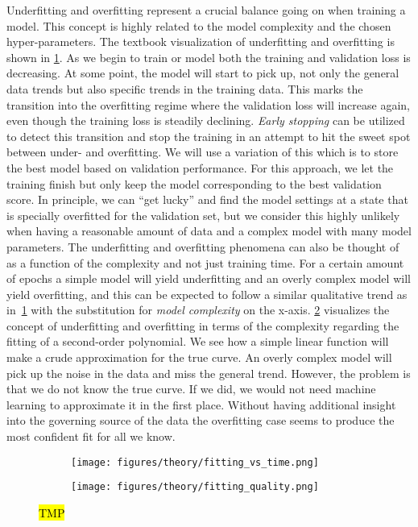 Underfitting and overfitting represent a crucial balance going on when training
a model. This concept is highly related to the model complexity and the chosen
hyper-parameters. The textbook visualization of underfitting and overfitting is
shown in \cref{fig:fitting_vs_time}. As we begin to train or model both the
training and validation loss is decreasing. At some point, the model will start
to pick up, not only the general data trends but also specific trends in the
training data. This marks the transition into the overfitting regime where the
validation loss will increase again, even though the training loss is steadily
declining.  \textit{Early stopping} can be utilized to detect this transition
and stop the training in an attempt to hit the sweet spot between under- and
overfitting. We will use a variation of this which is to store the best model
based on validation performance. For this approach, we let the training finish
but only keep the model corresponding to the best validation score. In
principle, we can ``get lucky'' and find the model settings at a state that is
specially overfitted for the validation set, but we consider this highly
unlikely when having a reasonable amount of data and a complex model with many
model parameters. The underfitting and overfitting phenomena can also be thought
of as a function of the complexity and not just training time. For a certain
amount of epochs a simple model will yield underfitting and an overly complex
model will yield overfitting, and this can be expected to follow a similar
qualitative trend as in~\cref{fig:fitting_vs_time} with the substitution for
\textit{model complexity} on the x-axis. \cref{fig:fitting_quality} visualizes
the concept of underfitting and overfitting in terms of the complexity regarding
the fitting of a second-order polynomial. We see how a simple linear function
will make a crude approximation for the true curve. An overly complex model will
pick up the noise in the data and miss the general trend. However, the problem
is that we do not know the true curve. If we did, we would not need machine
learning to approximate it in the first place. Without having additional insight
into the governing source of the data the overfitting case seems to produce the
most confident fit for all we know. 




\begin{figure}[H]
  \centering
  \begin{subfigure}[t]{0.42\textwidth}
    \centering
    \texttt{[image: figures/theory/fitting\_vs\_time.png]}
    \caption{}
    \label{fig:fitting_vs_time}
  \end{subfigure}
  \hfill
  \begin{subfigure}[t]{0.57\textwidth}
    \centering
    \texttt{[image: figures/theory/fitting\_quality.png]}
    \caption{}
    \label{fig:fitting_quality}
  \end{subfigure}
  \hfill
  \caption{\hl{TMP}}
  \label{fig:over_under_fitting}
\end{figure}



